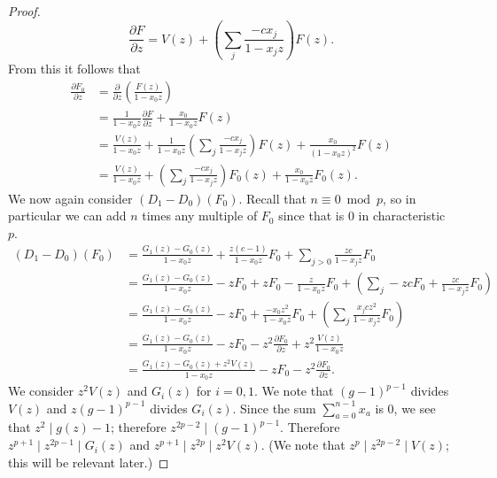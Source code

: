 \documentclass{amsart}
\numberwithin{equation}{section}
\theoremstyle{definition}
\begin{document}
\begin{proof}
\[\frac{\partial F}{\partial z}=V(z)+\left(\sum_j \frac{-cx_j}{1-x_jz}\right)F(z).
\]
From this it follows that
\begin{align*}
\frac{\partial F_0}{\partial z} &= \frac{\partial}{\partial z}\left(\frac{F(z)}{1-x_0z}\right)\\
&=\frac{1}{1-x_0z} \frac{\partial F}{\partial z}+\frac{x_0}{1-x_0z} F(z)\\
&=\frac{V(z)}{1-x_0z}+\frac{1}{1-x_0z}\left(\sum_j \frac{-cx_j}{1-x_jz}\right)F(z)+\frac{x_0}{(1-x_0z)^2} F(z)\\
&=\frac{V(z)}{1-x_0z}+\left(\sum_j \frac{-cx_j}{1-x_jz}\right)F_0(z)+\frac{x_0}{1-x_0z} F_0(z).
\end{align*}
We now again consider $(D_1-D_0)(F_0)$. Recall that $n \equiv 0 \bmod p$, so in particular we can add $n$ times any multiple of $F_0$ since that is $0$ in characteristic $p$. 
\begin{align*}
(D_1-D_0)(F_0)&=\frac{G_1(z)-G_0(z)}{1-x_0z}+\frac{z(c-1)}{1-x_0z}F_0+\sum_{j>0} \frac{zc}{1-x_jz}F_0\\
&=\frac{G_1(z)-G_0(z)}{1-x_0z}-zF_0+zF_0-\frac{z}{1-x_0z}F_0+\left(\sum_{j} -zcF_0+\frac{zc}{1-x_jz}F_0\right)\\
&=\frac{G_1(z)-G_0(z)}{1-x_0z}-zF_0+\frac{-x_0z^2}{1-x_0z}F_0+\left(\sum_{j} \frac{x_jcz^2}{1-x_jz}F_0\right)\\
&=\frac{G_1(z)-G_0(z)}{1-x_0z}-zF_0-z^2\frac{\partial F_0}{\partial z}+z^2\frac{V(z)}{1-x_0z}\\
&=\frac{G_1(z)-G_0(z)+z^2V(z)}{1-x_0z}-zF_0-z^2\frac{\partial F_0}{\partial z}.
\end{align*}
We consider $z^2V(z)$ and $G_i(z)$ for $i=0,1$. We note that $(g-1)^{p-1}$ divides $V(z)$ and $z(g-1)^{p-1}$ divides $G_i(z)$. Since the sum $\sum_{a=0}^{n-1} x_a$ is $0$, we see that $z^2 \mid g(z)-1$; therefore $z^{2p-2} \mid (g-1)^{p-1}$. Therefore $z^{p+1} \mid z^{2p-1} \mid G_i(z)$ and $z^{p+1} \mid z^{2p} \mid z^2V(z)$. (We note that $z^p \mid z^{2p-2} \mid V(z)$; this will be relevant later.)


\end{proof}
\end{document}
